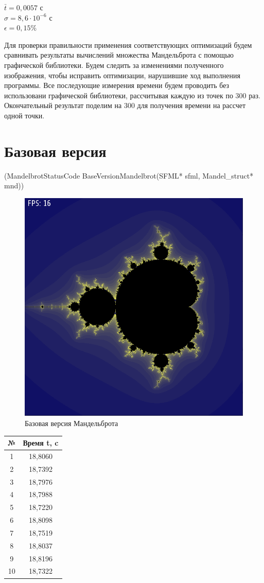 \documentclass[12pt, letterpaper]{article}
\begin{document}
    $\bar{t} = 0,0057$ с\\

    $\sigma = 8,6 \cdot 10^{-6}$ с\\

    $\epsilon = 0,15\%$

    \begin{table}
    Для проверки правильности применения соответствующих оптимизаций будем сравнивать результаты вычислений множества Мандельброта с помощью графической библиотеки. Будем следить за изменениями полученного изображения, чтобы исправить оптимизации, нарушившие ход выполнения программы. Все последующие измерения времени будем проводить без использовани графической библиотеки, рассчитывая каждую из точек по 300 раз. Окончательный результат поделим на 300 для получения времени на рассчет одной точки.

    \section{Базовая версия} (MandelbrotStatusCode BaseVersionMandelbrot(SFML* sfml, Mandel\_struct* mnd))

    \end{table}

    \begin{figure}[h]
        \centering
        \includegraphics[width=0.4\linewidth]{../data/imgs/mandelbrot.png}
        \caption{Базовая версия Мандельброта}
        \label{fig:enter-label}
    \end{figure}

    \begin{table}
        \begin{tabular}{cc}
        \toprule             %
        \textbf{№} & \textbf{Время t, c} \\
        \midrule             %
        1 & 18,8060 \\
        2 & 18,7392 \\
        3 & 18,7976 \\
        4 & 18,7988 \\
        5 & 18,7220 \\
        6 & 18,8098 \\
        7 & 18,7519 \\
        8 & 18,8037 \\
        9 & 18,8196 \\
        10 & 18,7322 \\
        \bottomrule          %
        \end{tabular}
    \end{table}
\end{document}
